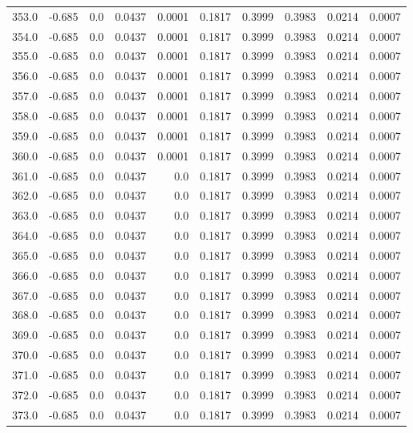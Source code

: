 \begin{longtable}{lrrrrrrrrr}
353.0 & -0.685 & 0.0 & 0.0437 & 0.0001 & 0.1817 & 0.3999 & 0.3983 & 0.0214 & 0.0007 \\
354.0 & -0.685 & 0.0 & 0.0437 & 0.0001 & 0.1817 & 0.3999 & 0.3983 & 0.0214 & 0.0007 \\
355.0 & -0.685 & 0.0 & 0.0437 & 0.0001 & 0.1817 & 0.3999 & 0.3983 & 0.0214 & 0.0007 \\
356.0 & -0.685 & 0.0 & 0.0437 & 0.0001 & 0.1817 & 0.3999 & 0.3983 & 0.0214 & 0.0007 \\
357.0 & -0.685 & 0.0 & 0.0437 & 0.0001 & 0.1817 & 0.3999 & 0.3983 & 0.0214 & 0.0007 \\
358.0 & -0.685 & 0.0 & 0.0437 & 0.0001 & 0.1817 & 0.3999 & 0.3983 & 0.0214 & 0.0007 \\
359.0 & -0.685 & 0.0 & 0.0437 & 0.0001 & 0.1817 & 0.3999 & 0.3983 & 0.0214 & 0.0007 \\
360.0 & -0.685 & 0.0 & 0.0437 & 0.0001 & 0.1817 & 0.3999 & 0.3983 & 0.0214 & 0.0007 \\
361.0 & -0.685 & 0.0 & 0.0437 & 0.0 & 0.1817 & 0.3999 & 0.3983 & 0.0214 & 0.0007 \\
362.0 & -0.685 & 0.0 & 0.0437 & 0.0 & 0.1817 & 0.3999 & 0.3983 & 0.0214 & 0.0007 \\
363.0 & -0.685 & 0.0 & 0.0437 & 0.0 & 0.1817 & 0.3999 & 0.3983 & 0.0214 & 0.0007 \\
364.0 & -0.685 & 0.0 & 0.0437 & 0.0 & 0.1817 & 0.3999 & 0.3983 & 0.0214 & 0.0007 \\
365.0 & -0.685 & 0.0 & 0.0437 & 0.0 & 0.1817 & 0.3999 & 0.3983 & 0.0214 & 0.0007 \\
366.0 & -0.685 & 0.0 & 0.0437 & 0.0 & 0.1817 & 0.3999 & 0.3983 & 0.0214 & 0.0007 \\
367.0 & -0.685 & 0.0 & 0.0437 & 0.0 & 0.1817 & 0.3999 & 0.3983 & 0.0214 & 0.0007 \\
368.0 & -0.685 & 0.0 & 0.0437 & 0.0 & 0.1817 & 0.3999 & 0.3983 & 0.0214 & 0.0007 \\
369.0 & -0.685 & 0.0 & 0.0437 & 0.0 & 0.1817 & 0.3999 & 0.3983 & 0.0214 & 0.0007 \\
370.0 & -0.685 & 0.0 & 0.0437 & 0.0 & 0.1817 & 0.3999 & 0.3983 & 0.0214 & 0.0007 \\
371.0 & -0.685 & 0.0 & 0.0437 & 0.0 & 0.1817 & 0.3999 & 0.3983 & 0.0214 & 0.0007 \\
372.0 & -0.685 & 0.0 & 0.0437 & 0.0 & 0.1817 & 0.3999 & 0.3983 & 0.0214 & 0.0007 \\
373.0 & -0.685 & 0.0 & 0.0437 & 0.0 & 0.1817 & 0.3999 & 0.3983 & 0.0214 & 0.0007 \\

\end{longtable}
